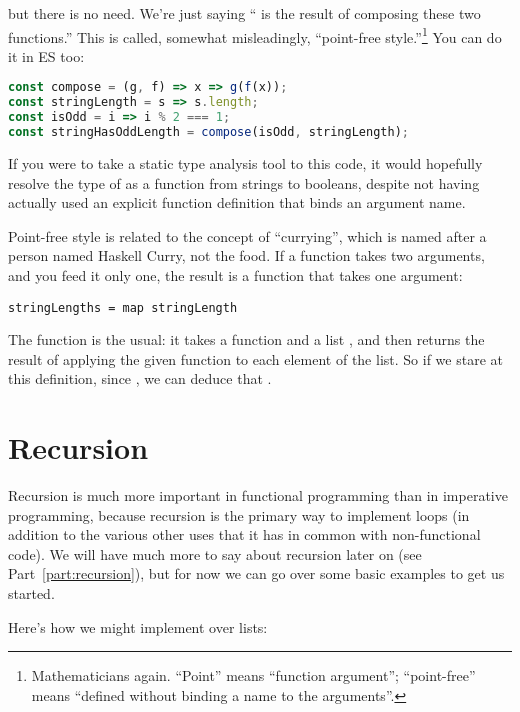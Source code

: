 \noindent but there is no need. We're just saying `` is the result of composing these two functions.'' This is called, somewhat misleadingly, ``point-free style.''\footnote{Mathematicians again. ``Point'' means ``function argument''; ``point-free'' means ``defined without binding a name to the arguments''.} You can do it in ES too:

\begin{lstlisting}[language=js]
const compose = (g, f) => x => g(f(x));
const stringLength = s => s.length;
const isOdd = i => i % 2 === 1;
const stringHasOddLength = compose(isOdd, stringLength);
\end{lstlisting}

If you were to take a static type analysis tool to this code, it would hopefully resolve the type of  as a function from strings to booleans, despite not having actually used an explicit function definition that binds an argument name.

Point-free style is related to the concept of ``currying'', which is named after a person named Haskell Curry, not the food. If a function takes two arguments, and you feed it only one, the result is a function that takes one argument:

\begin{lstlisting}[language=pseudoml]
stringLengths = map stringLength
\end{lstlisting}

The  function is the usual: it takes a function  and a list \mlil{[a]}, and then returns the result of applying the given function to each element of the list. So if we stare at this definition, since , we can deduce that .

\section{Recursion}\label{sec:recursion}

Recursion is much more important in functional programming than in imperative programming, because recursion is the primary way to implement loops (in addition to the various other uses that it has in common with non-functional code). We will have much more to say about recursion later on (see Part~\ref{part:recursion}), but for now we can go over some basic examples to get us started.

Here's how we might implement  over lists:

